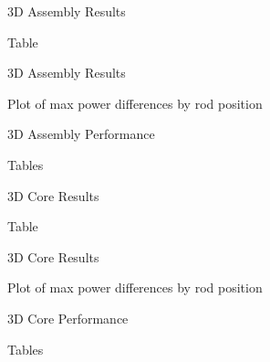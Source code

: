 
\begin{frame}[t]{3D Assembly Results}

Table

\end{frame}


\begin{frame}[t]{3D Assembly Results}
    
    Plot of max power differences by rod position
    
\end{frame}


\begin{frame}[t]{3D Assembly Performance}

Tables

\end{frame}


\begin{frame}[t]{3D Core Results}

Table

\end{frame}


\begin{frame}[t]{3D Core Results}

Plot of max power differences by rod position

\end{frame}


\begin{frame}[t]{3D Core Performance}

Tables

\end{frame}